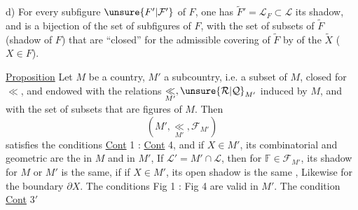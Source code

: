 d)  For every subfigure $\unsure{F'|\mathcal F'}$ of $F$, one has  $\widetilde F'=\mathcal L_F\subset \mathcal L$ its shadow, and
is a bijection of the set of subfigures of $F$, with the set of subsets of $\widetilde F$ (shadow of $F$) that are ``closed'' for the admissible covering of $\widetilde F$ by  of the $\widetilde X$ ($X\in F$).

\uline{Proposition} Let $M$ be a country, $M'$ a subcountry,  i.e. a subset of $M$, closed for $\ll$, and endowed with the relations $\underset{M'}{\ll},\unsure{\mathcal R|\mathcal Q}_{M'}$ induced by $M$, and with the set  of subsets   that are figures of $M$. Then
\[
(M',\underset{M'}{\ll},\mathcal F_{M'})
\]
satisfies the conditions \uline{Cont} 1 : \uline{Cont} 4, and if $X\in M'$, its combinatorial and geometric  are the  in $M$ and in $M'$, If $\mathcal L'=M'\cap \mathcal L$, then for  $\mathbb F\in\mathcal F_{M'}$, its  shadow for $M$ or $M'$ is the same, if if $X\in M'$,  its open shadow is the same , Likewise for the boundary $\partial X$. The conditions Fig 1 : Fig 4 are valid in $M'$. The condition \uline{Cont} $3'$  
